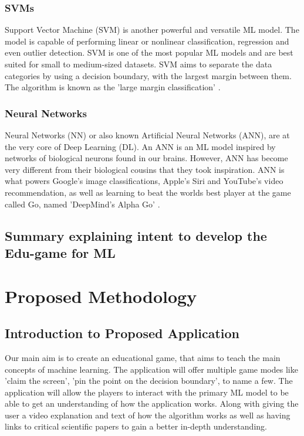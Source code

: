 \documentclass[a4paper,10pt]{article}
\begin{document}
\subsubsection{SVMs}
Support Vector Machine (SVM) is another powerful and versatile ML model. The model is capable of performing linear or nonlinear classification, regression and even outlier detection. SVM is one of the most popular ML models and are best suited for small to medium-sized datasets. SVM aims to separate the data categories by using a decision boundary, with the largest margin between them. The algorithm is known as the 'large margin classification' \cite{geron2019hands}.

\subsubsection{Neural Networks}
Neural Networks (NN) or also known Artificial Neural Networks (ANN), are at the very core of Deep Learning (DL). An ANN is an ML model inspired by networks of biological neurons found in our brains. However, ANN has become very different from their biological cousins that they took inspiration. ANN is what powers Google's image classifications, Apple's Siri and YouTube's video recommendation, as well as learning to beat the worlds best player at the game called Go, named 'DeepMind's Alpha Go' \cite{geron2019hands}.


\subsection{Summary explaining intent to develop the Edu-game for ML}


\section{Proposed Methodology}
\subsection{Introduction to Proposed Application}
Our main aim is to create an educational game, that aims to teach the main concepts of machine learning. The application will offer multiple game modes like 'claim the screen', 'pin the point on the decision boundary', to name a few. The application will allow the players to interact with the primary ML model to be able to get an understanding of how the application works. Along with giving the user a video explanation and text of how the algorithm works as well as having links to critical scientific papers to gain a better in-depth understanding.  
\end{document}
